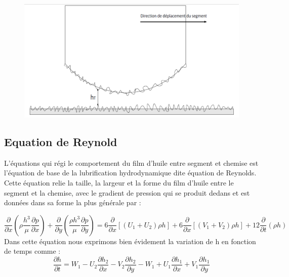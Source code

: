\begin{figure}[h]
	\centering
	\includegraphics[width=0.7\linewidth]{"Img/mode delubrification par le triplet"}
	\caption[Etat de lubrification triplet]{}
	\label{fig:mode-delubrification-par-le-triplet}
\end{figure}

\subsection{Equation de Reynold}
L’équations qui régi le comportement du film d'huile entre segment et chemise est l’équation de base de la lubrification hydrodynamique dite équation de Reynolds\cite{tribo1}. Cette équation relie la taille, la largeur et la forme du film d'huile entre le segment et la chemise, avec le gradient de pression qui se produit dedans et est données dans sa forme la plus générale par :

\begin{equation}
	\frac{\partial }{\partial x}(\rho \frac{h^3}{\mu}\frac{\partial p}{\partial x})+ \frac{\partial}{\partial y}(\frac{\rho h^3}{\mu}\frac{\partial p}{\partial y})=6\frac{\partial}{\partial x}[(U_{1}+U_{2})\rho h] +6\frac{\partial}{\partial x}[(V_{1}+V_{2})\rho h]+ 12 \frac{\partial}{\partial t}(\rho h)
	\label{equation-generale-raynold}
\end{equation}
Dans cette équation nous exprimons bien évidement la variation de h en fonction de temps comme :
\begin{equation}
	\frac{\partial h}{\partial t} =W_{1}-U_{2}\frac{\partial h_{2}}{\partial x}- V_{2}\frac{\partial h_{2}}{\partial y}- W_{1}+U_{1}\frac{\partial h_{1}}{\partial x}+V_{1}\frac{\partial h_{1}}{\partial y}
\end{equation}

